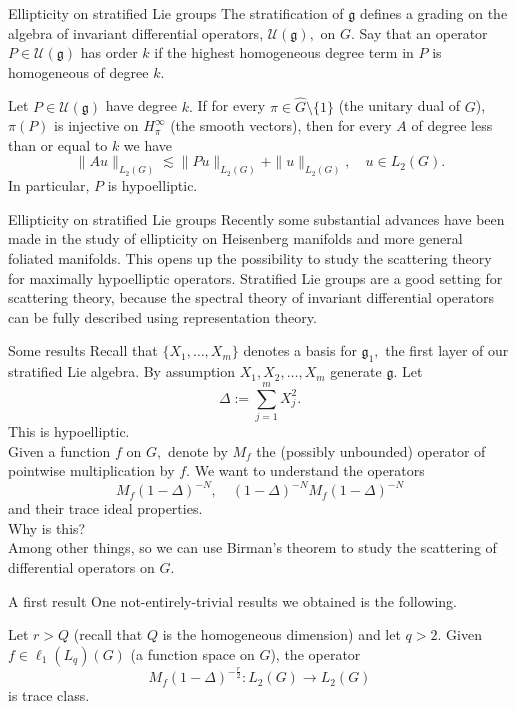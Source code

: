 \documentclass{beamer}
\numberwithin{equation}{section}
\theoremstyle{plain}
\theoremstyle{plain}
\theoremstyle{definition}
\theoremstyle{plain}
\theoremstyle{plain}
\theoremstyle{definition}
\newcommand{\Uc}{\mathcal{U}}
\newcommand{\gf}{\mathfrak{g}}
\begin{document}
\begin{frame}{Ellipticity on stratified Lie groups}
  The stratification of $\gf$ defines a grading on the algebra of invariant differential operators, $\Uc(\gf),$ on $G.$
  Say that an operator $P\in \Uc(\gf)$ has order $k$ if the highest homogeneous degree term in $P$ is homogeneous of degree $k.$

  \begin{theorem}
    Let $P \in \Uc(\gf)$ have degree $k.$ If for every $\pi \in \widehat{G}\setminus \{1\}$ (the unitary dual of $G$), $\pi(P)$
    is injective on $H^{\infty}_\pi$ (the smooth vectors), then for every $A$ of degree less than or equal to $k$ we have
    \[
      \|Au\|_{L_2(G)} \lesssim \|Pu\|_{L_2(G)}+\|u\|_{L_2(G)},\quad u\in L_2(G).
    \]
    In particular, $P$ is hypoelliptic.
  \end{theorem}
\end{frame}

\begin{frame}{Ellipticity on stratified Lie groups}
  Recently some substantial advances have been made in the study of ellipticity on Heisenberg manifolds and more general foliated manifolds.
  \pause
  This opens up the possibility to study the scattering theory for maximally hypoelliptic operators.
  \pause
  Stratified Lie groups are a good setting for scattering theory, because the spectral theory of invariant differential operators can be fully described using representation theory.
\end{frame}

\begin{frame}{Some results}
Recall that $\{X_1,\ldots,X_m\}$ denotes a basis for $\gf_1,$ the first layer of our stratified Lie algebra. By assumption $X_1,X_2,\ldots,X_m$ generate $\gf.$ Let
\[
  \Delta := \sum_{j=1}^m X_j^2.
\]
This is hypoelliptic.\\
\pause
Given a function $f$ on $G,$ denote by $M_f$ the (possibly unbounded) operator of pointwise multiplication by $f.$ We want to understand the operators
\[
  M_f(1-\Delta)^{-N},\quad (1-\Delta)^{-N}M_f(1-\Delta)^{-N}
\]
and their trace ideal properties.\\
\pause
Why is this?\\
\pause
Among other things, so we can use Birman's theorem to study the scattering of differential operators on $G.$
\end{frame}

\begin{frame}{A first result}
One not-entirely-trivial results we obtained is the following.
\begin{theorem}
  Let $r>Q$ (recall that $Q$ is the homogeneous dimension) and let $q>2.$ Given $f \in \ell_1(L_q)(G)$ {\color{red}(a function space on $G$)}, the operator
  \[
M_f(1-\Delta)^{-\frac{r}{2}}:L_2(G)\to L_2(G)
  \]
  is trace class.
\end{theorem}
\end{frame}
\end{document}
